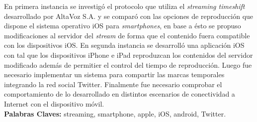  

En primera instancia se investigó el protocolo que utiliza el \textit{streaming timeshift} desarrollado por AltaVoz S.A. y se comparó con las opciones de reproducción que dispone el sistema operativo iOS para \textit{smartphones}, en base a ésto se propuso modificaciones al servidor del \textit{stream} de forma que el contenido fuera compatible con los dispositivos iOS. En segunda instancia se desarrolló una aplicación iOS con tal que los dispositivos iPhone e iPad reproduzcan los contenidos del servidor modificado además de permitier el control del tiempo de reproducción. Luego fue necesario implementar un sistema para compartir las marcas temporales integrando la red social Twitter. Finalmente fue necesario comprobar el comportamiento de lo desarrollado en distintos escenarios de conectividad a Internet con el dispositivo móvil.\\


\textbf{Palabras Claves:} streaming, smartphone, apple, iOS, android, Twitter.

